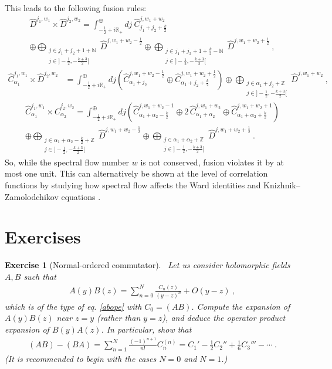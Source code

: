 \documentclass[12pt, a4paper, notitlepage, twoside]{report}
\numberwithin{equation}{section}
\theoremstyle{break}
\newtheorem{exo}{Exercise}[chapter]
\begin{document}
This leads to the following fusion rules:
\begin{multline}
\hat{D}^{j_1,w_1}\times \hat{D}^{j_2,w_2} = \int^\oplus_{-\frac12+i{\mathbb{R}}_+} dj\ \hat{C}^{j,w_1+w_2}_{j_1+j_2+\frac{k}{2}} 
\\ \oplus 
\bigoplus_{\substack{j\in j_1+j_2+1+{\mathbb{N}} \\ j\in ]-\frac12, -\frac{k+3}{2}[}} \hat{D}^{j,w_1+w_2-\frac12} \oplus 
\bigoplus_{\substack{j\in j_1+j_2+1+\frac{k}{2}-{\mathbb{N}} \\ j\in ]-\frac12, -\frac{k+3}{2}[}} \hat{D}^{j,w_1+w_2+\frac12}\ ,
\end{multline}
\begin{align}
 \hat{C}^{j_1,w_1}_{\alpha_1}\times \hat{D}^{j_2,w_2} &= \int^\oplus_{-\frac12+i{\mathbb{R}}_+} dj\left( \hat{C}^{j,w_1+w_2-\frac12}_{\alpha_1+j_2} \oplus \hat{C}^{j,w_1+w_2+\frac12}_{\alpha_1+j_2+\frac{k}{2}}\right) \oplus \bigoplus_{\substack{j\in \alpha_1+j_2+{\mathbb{Z}} \\ j\in ]-\frac12, -\frac{k+3}{2}[}} \hat{D}^{j,w_1+w_2}\ ,
\end{align}
\begin{multline}
 \hat{C}^{j_1,w_1}_{\alpha_1}\times \hat{C}^{j_2,w_2}_{\alpha_2} = \int^\oplus_{-\frac12+i{\mathbb{R}}_+} dj \left(\hat{C}^{j,w_1+w_2-1}_{\alpha_1+\alpha_2-\frac{k}{2}} \oplus 2\, \hat{C}^{j,w_1+w_2}_{\alpha_1+\alpha_2} \oplus \hat{C}^{j,w_1+w_2+1}_{\alpha_1+\alpha_2+\frac{k}{2}}\right) 
\\
\oplus \bigoplus_{\substack{j\in \alpha_1+\alpha_2-\frac{k}{2}+{\mathbb{Z}} \\ j\in]-\frac12, -\frac{k+3}{2}[}} \hat{D}^{j,w_1+w_2-\frac12} 
\oplus \bigoplus_{\substack{j\in \alpha_1+\alpha_2+{\mathbb{Z}} \\ j\in]-\frac12, -\frac{k+3}{2}[}} \hat{D}^{j,w_1+w_2+\frac12} \ .
\end{multline}
So, while the spectral flow number $w$ is not conserved, fusion violates it by at most one unit.
This can alternatively be shown at the level of correlation functions by studying how spectral flow affects the Ward identities and Knizhnik--Zamolodchikov equations \cite{rib05}.

\section{Exercises}

\begin{exo}[Normal-ordered commutator]
~\label{exoabba}
Let us consider holomorphic fields $A,B$ such that 
\begin{align}
 A(y)B(z) = \sum_{n=0}^N \frac{C_n(z)}{(y-z)^n} + O(y-z)\ ,
\end{align}
which is of the type of eq. \eqref{abope} with $C_0 = (AB)$. 
Compute the expansion of $A(y)B(z)$ near $z=y$ (rather than $y=z$), and deduce the operator product expansion of $B(y)A(z)$. 
In particular, show that 
\begin{align}
 (AB)-(BA) = \sum_{n=1}^N \frac{(-1)^{n+1}}{n!} C_n^{(n)} = C_1'-\frac12 C_2'' + \frac16 C_3''' -\cdots \ .
\end{align}
(It is recommended to begin with the cases $N=0$ and $N=1$.)
\end{exo}
\end{document}
